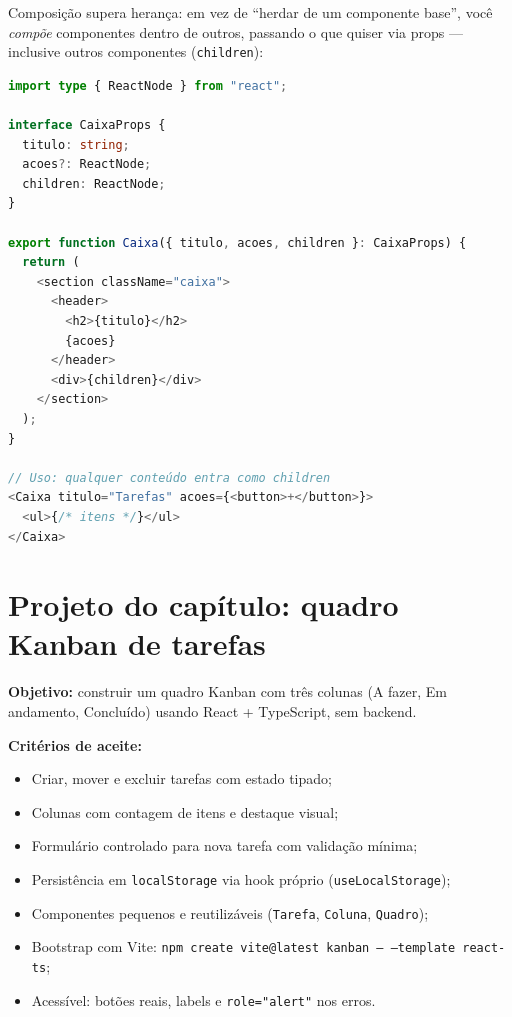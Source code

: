 Composição supera herança: em vez de ``herdar de um componente base'', você
\emph{compõe} componentes dentro de outros, passando o que quiser via props —
inclusive outros componentes (\texttt{children}):

\begin{lstlisting}[style=livro, language=TypeScript,
  caption={Composição com children.}, label={list:react-composicao}]
import type { ReactNode } from "react";

interface CaixaProps {
  titulo: string;
  acoes?: ReactNode;
  children: ReactNode;
}

export function Caixa({ titulo, acoes, children }: CaixaProps) {
  return (
    <section className="caixa">
      <header>
        <h2>{titulo}</h2>
        {acoes}
      </header>
      <div>{children}</div>
    </section>
  );
}

// Uso: qualquer conteúdo entra como children
<Caixa titulo="Tarefas" acoes={<button>+</button>}>
  <ul>{/* itens */}</ul>
</Caixa>
\end{lstlisting}

\section{Projeto do capítulo: quadro Kanban de tarefas}
\label{sec:projeto7}

\begin{caixaprojeto}
\textbf{Objetivo:} construir um quadro Kanban com três colunas (A fazer, Em
andamento, Concluído) usando React + TypeScript, sem backend.

\textbf{Critérios de aceite:}
\begin{itemize}[leftmargin=*, itemsep=0.2em]
  \item Criar, mover e excluir tarefas com estado tipado;
  \item Colunas com contagem de itens e destaque visual;
  \item Formulário controlado para nova tarefa com validação mínima;
  \item Persistência em \texttt{localStorage} via hook próprio
  (\texttt{useLocalStorage});
  \item Componentes pequenos e reutilizáveis (\texttt{Tarefa}, \texttt{Coluna}, \texttt{Quadro});
  \item Bootstrap com Vite: \texttt{npm create vite@latest kanban -- --template react-ts};
  \item Acessível: botões reais, labels e \texttt{role="alert"} nos erros.
\end{itemize}
\end{caixaprojeto}

